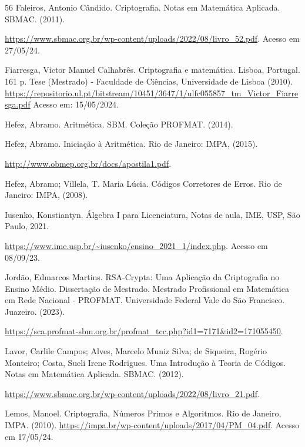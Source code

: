 \documentclass[oneside,a4paper,12pt]{book}
\theoremstyle{plain}
\begin{document}
\begin{thebibliography}{56}
 Faleiros, Antonio Cândido. Criptografia. Notas em Matemática Aplicada. SBMAC.  (2011).

\url{https://www.sbmac.org.br/wp-content/uploads/2022/08/livro_52.pdf}. Acesso em 27/05/24.

 Fiarresga, Victor Manuel Calhabrês. Criptografia e matemática.  Lisboa, Portugal. 161 p. Tese (Mestrado) - Faculdade de Ciências, Universidade de Lisboa  (2010). 
\url{https://repositorio.ul.pt/bitstream/10451/3647/1/ulfc055857_tm_Victor_Fiarresga.pdf} Acesso em: 15/05/2024.

 Hefez, Abramo. Aritmética. SBM. Coleção PROFMAT. (2014).

 Hefez, Abramo. Iniciação à Aritmética. Rio de Janeiro: IMPA, (2015).

\url{http://www.obmep.org.br/docs/apostila1.pdf}.

 Hefez, Abramo; Villela, T. Maria Lúcia. Códigos Corretores de Erros. Rio de Janeiro: IMPA, (2008).



 Iusenko, Konstiantyn. Álgebra I para Licenciatura, Notas de aula, IME, USP, São Paulo, 2021.

\url{https://www.ime.usp.br/~iusenko/ensino_2021_1/index.php}. Acesso em 08/09/23.

 Jordão, Edmarcos Martins. RSA-Crypta: Uma Aplicação da Criptografia no Ensino Médio. Dissertação de Mestrado. Mestrado Profissional em Matemática em Rede Nacional - PROFMAT. Universidade Federal Vale do São Francisco. Juazeiro. (2023).

\url{https://sca.profmat-sbm.org.br/profmat_tcc.php?id1=7171&id2=171055450}.

 Lavor, Carlile Campos; Alves, Marcelo Muniz Silva; de Siqueira, Rogério Monteiro; Costa, Sueli Irene Rodrigues. Uma Introdução à Teoria de Códigos. Notas em Matemática Aplicada. SBMAC. (2012).

\url{https://www.sbmac.org.br/wp-content/uploads/2022/08/livro_21.pdf}.

 Lemos, Manoel. Criptografia, Números Primos e Algoritmos. Rio de Janeiro, IMPA. (2010).
\url{https://impa.br/wp-content/uploads/2017/04/PM_04.pdf}. Acesso em 17/05/24.


\end{thebibliography}
\end{document}
